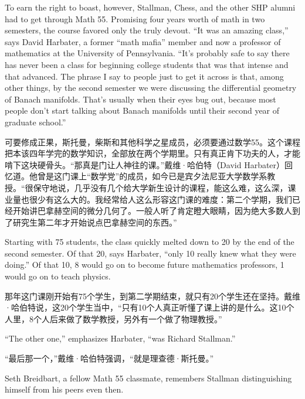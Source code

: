 \ifdefined\eng
To earn the right to boast, however, Stallman, Chess, and the other SHP alumni had to get through Math 55. Promising four years worth of math in two semesters, the course favored only the truly devout. ``It was an amazing class,'' says David Harbater, a former ``math mafia'' member and now a professor of mathematics at the University of Pennsylvania. ``It's probably safe to say there has never been a class for beginning college students that was that intense and that advanced. The phrase I say to people just to get it across is that, among other things, by the second semester we were discussing the differential geometry of Banach manifolds. That's usually when their eyes bug out, because most people don't start talking about Banach manifolds until their second year of graduate school.''
\fi

\ifdefined\chs
可要修成正果，斯托曼，柴斯和其他科学之星成员，必须要通过数学55。这个课程把本该四年学完的数学知识，全部放在两个学期里。只有真正肯下功夫的人，才能啃下这块硬骨头。``那真是门让人神往的课。''戴维·哈伯特（David Harbater）回忆道。他曾是这门课上``数学党''的成员，如今已是宾夕法尼亚大学数学系教授。``很保守地说，几乎没有几个给大学新生设计的课程，能这么难，这么深，课业量也很少有这么大的。我经常给人这么形容这门课的难度：第二个学期，我们已经开始讲巴拿赫空间的微分几何了。一般人听了肯定瞪大眼睛，因为绝大多数人到了研究生第二年才开始说点巴拿赫空间的东西。''
\fi

\ifdefined\eng
Starting with 75 students, the class quickly melted down to 20 by the end of the second semester. Of that 20, says Harbater, ``only 10 really knew what they were doing.'' Of that 10, 8 would go on to become future mathematics professors, 1 would go on to teach physics.
\fi

\ifdefined\chs
那年这门课刚开始有75个学生，到第二学期结束，就只有20个学生还在坚持。戴维·哈伯特说，这20个学生当中，``只有10个人真正听懂了课上讲的是什么。这10个人里，8个人后来做了数学教授，另外有一个做了物理教授。''
\fi

\ifdefined\eng
``The other one,'' emphasizes Harbater, ``was Richard Stallman.''
\fi

\ifdefined\chs
``最后那一个，''戴维·哈伯特强调，``就是理查德·斯托曼。''
\fi

\ifdefined\eng
Seth Breidbart, a fellow Math 55 classmate, remembers Stallman distinguishing himself from his peers even then.
\fi

